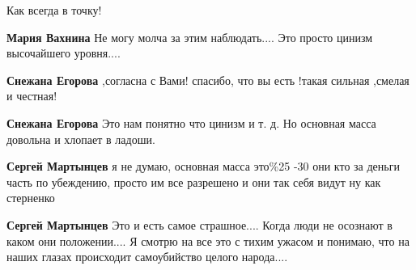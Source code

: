 \begin{itemize}
Как всегда в точку!

\begin{itemize}
 
\textbf{Мария Вахнина}
Не могу молча за этим наблюдать....
Это просто цинизм высочайшего уровня....

 
\textbf{Снежана Егорова} ,согласна с Вами! спасибо, что вы есть !такая сильная ,смелая и честная!

 
\textbf{Снежана Егорова} Это нам понятно что цинизм и т. д. Но основная масса довольна и хлопает в ладоши.

 
\textbf{Сергей Мартынцев} я не думаю, основная масса это\%25 -30 они кто за
деньги часть по убеждению, просто им все разрешено и они так себя видут ну как
стерненко


 
\textbf{Сергей Мартынцев} Это и есть самое страшное....
Когда люди не осознают в каком они положении....
Я смотрю на все это с тихим ужасом и понимаю, что на наших глазах происходит самоубийство целого народа....

 

\end{itemize}
\end{itemize}
